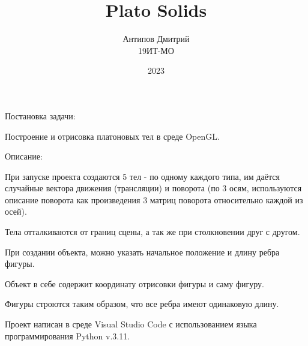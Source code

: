 \documentclass[12pt, a4paper]{article}
\title{Plato Solids}
\author{Антипов Дмитрий\\19ИТ-МО}
\date{2023}
\begin{document}
\maketitle

Постановка задачи:
\begin{list}{}{}
	\item Построение и отрисовка платоновых тел в среде OpenGL.
\end{list}

\hfill \break

Описание:
\begin{list}{}{}
	\item При запуске проекта создаются 5 тел - по одному каждого типа, им даётся случайные вектора движения (трансляции) и поворота (по 3 осям, используются описание поворота как произведения 3 матриц поворота относительно каждой из осей).
	\item Тела отталкиваются от границ сцены, а так же при столкновении друг с другом.
	\item При создании объекта, можно указать начальное положение и длину ребра фигуры.
	\item Объект в себе содержит координату отрисовки фигуры и саму фигуру.
	\item Фигуры строются таким образом, что все ребра имеют одинаковую длину.
\end{list}

\break

Проект написан в среде Visual Studio Code с использованием языка программирования Python v.3.11.
\end{document}
